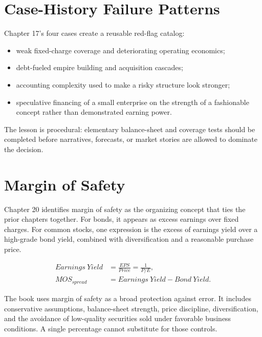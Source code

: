 \documentclass[11pt]{article}
\begin{document}
\section{Case-History Failure Patterns}
Chapter 17's four cases create a reusable red-flag catalog:
\begin{itemize}
\item weak fixed-charge coverage and deteriorating operating economics;
\item debt-fueled empire building and acquisition cascades;
\item accounting complexity used to make a risky structure look stronger;
\item speculative financing of a small enterprise on the strength of a fashionable concept rather than demonstrated earning power.
\end{itemize}
The lesson is procedural: elementary balance-sheet and coverage tests should be completed before narratives, forecasts, or market stories are allowed to dominate the decision.

\section{Margin of Safety}
Chapter 20 identifies margin of safety as the organizing concept that ties the prior chapters together. For bonds, it appears as excess earnings over fixed charges. For common stocks, one expression is the excess of earnings yield over a high-grade bond yield, combined with diversification and a reasonable purchase price.

\begin{align}
Earnings\ Yield &= \frac{EPS}{Price}=\frac{1}{P/E},\\
MOS_{spread} &= Earnings\ Yield - Bond\ Yield.
\end{align}

\begin{cautionbox}
The book uses margin of safety as a broad protection against error. It includes conservative assumptions, balance-sheet strength, price discipline, diversification, and the avoidance of low-quality securities sold under favorable business conditions. A single percentage cannot substitute for those controls.
\end{cautionbox}
\end{document}
